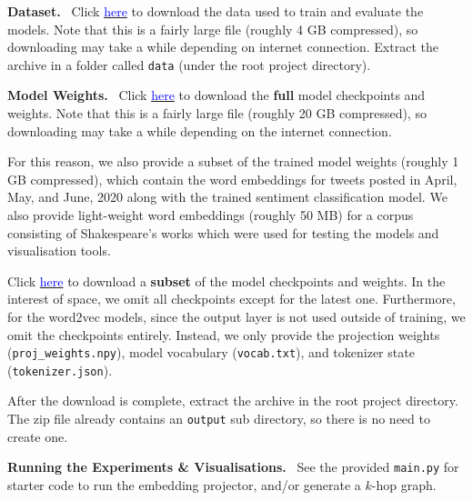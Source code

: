 \documentclass{paper}
\newcommand{\inlineSection}[1]{\vspace{0.5em}\noindent\textbf{#1.}~}
\begin{document}
\inlineSection{Dataset} Click \href{https://drive.google.com/file/d/16TWeFHXcywSoc13vrsw9SxEZ4lJndp4g/view?usp=sharing}{\textcolor{blue}{here}} to download the data used to train and evaluate the models. Note that this is a fairly large file (roughly 4 GB compressed), so downloading may take a while depending on internet connection. Extract the archive in a folder called \texttt{data} (under the root project directory).

\inlineSection{Model Weights} Click \href{https://mega.nz/file/b0EViYzT\#MEgk2yE5M3fjYUimtyhAj6XzZK5lZr7G29bPGN1rc20}{\textcolor{blue}{here}} to download the \textbf{full} model checkpoints and weights. Note that this is a fairly large file (roughly 20 GB compressed), so downloading may take a while depending on the internet connection.

For this reason, we also provide a subset of the trained model weights (roughly 1 GB compressed), which contain the word embeddings for tweets posted in April, May, and June, 2020 along with the trained sentiment classification model. We also provide light-weight word embeddings (roughly 50 MB) for a corpus consisting of Shakespeare's works which were used for testing the models and visualisation tools.

Click \href{https://mega.nz/file/28FQmbZY\#nHoAVB3AL0OdyyP58KVLjMG6GTm5eLt77EgyF60xOn4}{\textcolor{blue}{here}} to download a \textbf{subset} of the model checkpoints and weights. In the interest of space, we omit all checkpoints except for the latest one. Furthermore, for the word2vec models, since the output layer is not used outside of training, we omit the checkpoints entirely. Instead, we only provide the projection weights (\texttt{proj\_weights.npy}), model vocabulary (\texttt{vocab.txt}), and tokenizer state (\texttt{tokenizer.json}).

After the download is complete, extract the archive in the root project directory. The zip file already contains an \texttt{output} sub directory, so there is no need to create one.

\inlineSection{Running the Experiments \& Visualisations} See the provided \texttt{main.py} for starter code to run the embedding projector, and/or generate a $k$-hop graph.
\end{document}
